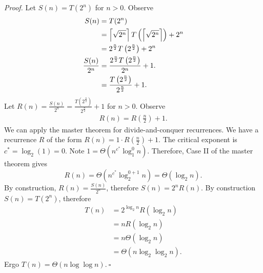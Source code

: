 \begin{enumerate}
\textit{Proof. }
Let $S(n)=T(2^n)$ for $n>0$. Observe
\begin{align*}
S(n)&=T(2^n)\\
&=\left\lceil\sqrt{2^n}\right\rceil T\left(\left\lceil\sqrt{2^n}\right\rceil\right)+2^n\\
&=2^{\frac{n}{2}}T\left(2^{\frac{n}{2}}\right)+2^n\\
\frac{S(n)}{2^n}&=\frac{2^{\frac{n}{2}}T\left(2^{\frac{n}{2}}\right)}{2^n}+1.\\
&=\frac{T\left(2^{\frac{n}{2}}\right)}{2^{\frac{n}{2}}}+1.
\end{align*}
Let $R(n)=\frac{S(n)}{2^n}=\frac{T\left(2^{\frac{n}{2}}\right)}{2^{\frac{n}{2}}}+1$ for $n>0$. Observe
\begin{align*}
R(n)=R\left(\frac{n}{2}\right)+1.
\end{align*}
We can apply the master theorem for divide-and-conquer recurrences. We have a recurrence $R$ of the form $R(n)=1\cdot R\left(\frac{n}{2}\right)+1$. The critical exponent is $c^*=\log_2(1)=0$. Note $1=\Theta(n^{c^*}\log_1^0 n)$. Therefore, Case II of the master theorem gives
\begin{equation*}
R(n)=\Theta(n^{c^*}\log_2^{0+1}n)=\Theta(\log_2n).
\end{equation*}
By construction, $R(n)=\frac{S(n)}{2^n}$, therefore $S(n)=2^nR(n)$. By construction $S(n)=T(2^n)$, therefore
\begin{align*}
T(n)&=2^{\log_2n}R(\log_2n)\\
&=nR(\log_2n)\\
&=n\Theta(\log_2n)\\
&=\Theta(n\log_2\log_2n).
\end{align*}
Ergo $T(n)=\Theta(n\log\log n)$.$~\square$
\end{enumerate}
